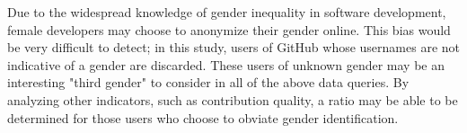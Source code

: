 \documentclass{sigplanconf}
\begin{document}
\cite{elamin2010saudiwomen}

Due to the widespread knowledge of gender inequality in software development,
female developers may choose to anonymize their gender online. This bias would
be very difficult to detect; in this study, users of GitHub whose usernames are
not indicative of a gender are discarded. These users of unknown gender may be
an interesting "third gender" to consider in all of the above data queries. By
analyzing other indicators, such as contribution quality, a ratio may be able to
be determined for those users who choose to obviate gender identification.


\acks





\end{document}
